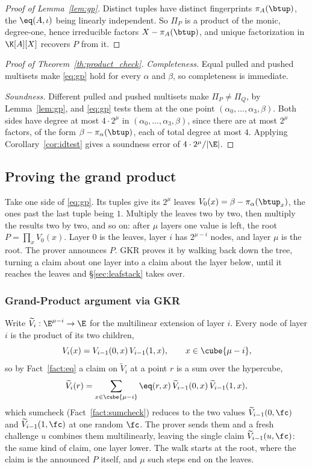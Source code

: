 \begin{proof}[Proof of Lemma~\ref{lem:gp}]
Distinct tuples have distinct fingerprints $\pi_A(\btup)$, the $\eq(A,\iota)$ being linearly independent. So $\Pi_P$ is a product of the monic, degree-one, hence irreducible factors $X-\pi_A(\btup)$, and unique factorization in $\K[A][X]$ recovers $P$ from it.
\end{proof}


\begin{proof}[Proof of Theorem~\ref{th:product_check}]
\emph{Completeness.} Equal pulled and pushed multisets make \eqref{eq:gp} hold for every $\alpha$ and $\beta$, so completeness is immediate.

\emph{Soundness.} Different pulled and pushed multisets make $\Pi_P\neq\Pi_Q$, by Lemma~\ref{lem:gp}, and \eqref{eq:gp} tests them at the one point $(\alpha_0, \dots, \alpha_3, \beta)$. Both sides have degree at most $4\cdot 2^{\mu}$ in $(\alpha_0, \dots, \alpha_3, \beta)$, since there are at most $2^{\mu}$ factors, of the form $\beta-\pi_\alpha(\btup)$, each of total degree at most $4$. Applying Corollary~\ref{cor:idtest} gives a soundness error of $4\cdot 2^{\mu}/|\E|$.
\end{proof}

\subsection{Proving the grand product}\label{sec:gkr}

Take one side of \eqref{eq:gp}. Its tuples give its $2^{\mu}$ leaves $V_0(x)=\beta-\pi_\alpha(\btup_x)$, the ones past the last tuple being $1$. Multiply the leaves two by two, then multiply the results two by two, and so on: after $\mu$ layers one value is left, the root $P=\prod_xV_0(x)$. Layer $0$ is the leaves, layer $i$ has $2^{\mu-i}$ nodes, and layer $\mu$ is the root. The prover announces $P$. GKR proves it by walking back down the tree, turning a claim about one layer into a claim about the layer below, until it reaches the leaves and \S\ref{sec:leafstack} takes over.

\subsubsection{Grand-Product argument via GKR}

Write $\widetilde V_i:\E^{\mu-i}\to\E$ for the multilinear extension of layer $i$. Every node of layer $i$ is the product of its two children,
\[
V_i(x)=V_{i-1}(0,x)\,V_{i-1}(1,x),\qquad x\in\cube{\mu-i},
\]
so by Fact~\ref{fact:eq} a claim on $\widetilde V_i$ at a point $r$ is a sum over the hypercube,
\[
\widetilde V_i(r)=\sum_{x\in\cube{\mu-i}}\eq(r,x)\,\widetilde V_{i-1}(0,x)\,\widetilde V_{i-1}(1,x),
\]
which sumcheck (Fact~\ref{fact:sumcheck}) reduces to the two values $\widetilde V_{i-1}(0,\fc)$ and $\widetilde V_{i-1}(1,\fc)$ at one random $\fc$. The prover sends them and a fresh challenge $u$ combines them multilinearly, leaving the single claim $\widetilde V_{i-1}(u,\fc)$: the same kind of claim, one layer lower. The walk starts at the root, where the claim is the announced $P$ itself, and $\mu$ such steps end on the leaves.

